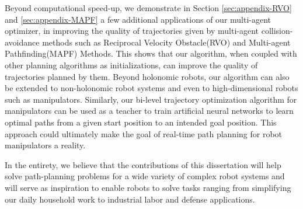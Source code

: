 Beyond computational speed-up, we demonstrate in Section \ref{sec:appendix-RVO} and \ref{sec:appendix-MAPF} a few additional applications of our multi-agent optimizer, in improving the quality of trajectories given by multi-agent collision-avoidance methods such as Reciprocal Velocity Obstacle(RVO) and Multi-agent Pathfinding(MAPF) Methods. This shows that our algorithm, when coupled with other planning algorithms as initializations, can improve the quality of trajectories planned by them. Beyond holonomic robots, our algorithm can also be extended to non-holonomic robot systems and even to high-dimensional robots such as manipulators. Similarly, our bi-level trajectory optimization algorithm for manipulators can be used as a teacher to train artificial neural networks to learn optimal paths from a given start position to an intended goal position. This approach could ultimately make the goal of real-time path planning for robot manipulators a reality. 

In the entirety, we believe that the contributions of this dissertation will help solve path-planning problems for a wide variety of complex robot systems and will serve as inspiration to enable robots to solve tasks ranging from simplifying our daily household work to industrial labor and defense applications. 
